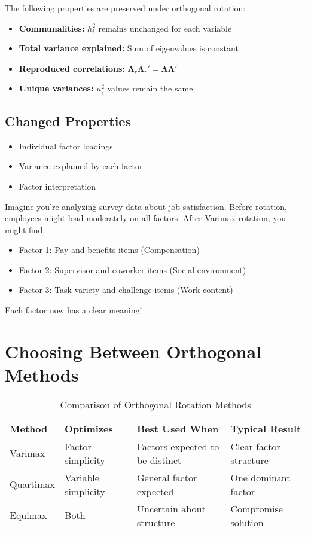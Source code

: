 \documentclass[a4paper]{tufte-book}
\begin{document}
The following properties are preserved under orthogonal rotation:

\begin{itemize}
\item \textbf{Communalities:} $h_i^2$ remains unchanged for each variable
\item \textbf{Total variance explained:} Sum of eigenvalues is constant
\item \textbf{Reproduced correlations:} $\boldsymbol{\Lambda}_r\boldsymbol{\Lambda}_r' = \boldsymbol{\Lambda}\boldsymbol{\Lambda}'$
\item \textbf{Unique variances:} $u_i^2$ values remain the same
\end{itemize}

\subsection{Changed Properties}

\begin{itemize}
\item Individual factor loadings
\item Variance explained by each factor
\item Factor interpretation
\end{itemize}

\begin{practicalapplication}
Imagine you're analyzing survey data about job satisfaction. Before rotation, employees might load moderately on all factors. After Varimax rotation, you might find:
\begin{itemize}
\item Factor 1: Pay and benefits items (Compensation)
\item Factor 2: Supervisor and coworker items (Social environment)
\item Factor 3: Task variety and challenge items (Work content)
\end{itemize}
Each factor now has a clear meaning!
\end{practicalapplication}

\section{Choosing Between Orthogonal Methods}

\begin{table}[h]
\centering
\caption{Comparison of Orthogonal Rotation Methods}
\begin{tabular}{@{}llll@{}}
\toprule
\textbf{Method} & \textbf{Optimizes} & \textbf{Best Used When} & \textbf{Typical Result} \\
\midrule
Varimax & Factor simplicity & Factors expected to be distinct & Clear factor structure \\
Quartimax & Variable simplicity & General factor expected & One dominant factor \\
Equimax & Both & Uncertain about structure & Compromise solution \\
\bottomrule
\end{tabular}
\end{table}
\end{document}

